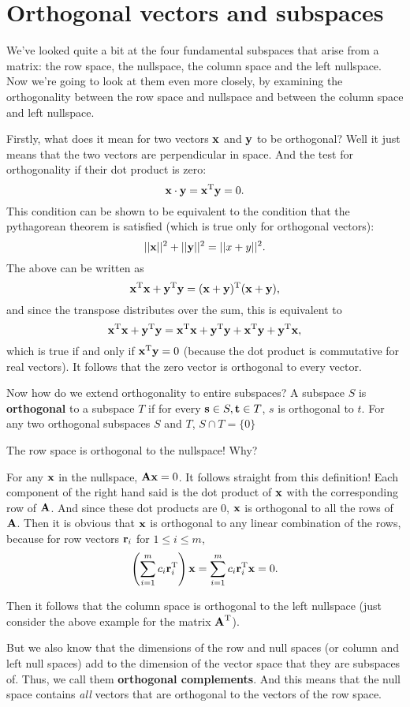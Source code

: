 \section{Orthogonal vectors and subspaces}

We've looked quite a bit at the four fundamental subspaces that arise from a matrix: the row space, the nullspace, the column space and the left nullspace. Now we're going to look at them even more closely, by examining the orthogonality between the row space and nullspace and between the column space and left nullspace.

Firstly, what does it mean for two vectors $\boldsymbol{\mathbf{x}}$ and $\boldsymbol{\mathbf{y}}$ to be orthogonal? Well it just means that the two vectors are perpendicular in space. And the test for orthogonality if their dot product is zero:
\[ \boldsymbol{\mathbf{x}} \cdot \boldsymbol{\mathbf{y}} = \boldsymbol{\mathbf{x}}^\mathrm{T} \boldsymbol{\mathbf{y}} = 0. \]
This condition can be shown to be equivalent to the condition that the pythagorean theorem is satisfied (which is true only for orthogonal vectors):
\[ ||\boldsymbol{\mathbf{x}}||^2 + ||\boldsymbol{\mathbf{y}}||^2 = ||x+y||^2. \]
The above can be written as
\[ \boldsymbol{\mathbf{x}}^\mathrm{T} \boldsymbol{\mathbf{x}} + \boldsymbol{\mathbf{y}}^\mathrm{T} \boldsymbol{\mathbf{y}} = (\boldsymbol{\mathbf{x}}+\boldsymbol{\mathbf{y}})^\mathrm{T}(\boldsymbol{\mathbf{x}} + \boldsymbol{\mathbf{y}}), \]
and since the transpose distributes over the sum, this is equivalent to
\[ \boldsymbol{\mathbf{x}}^\mathrm{T} \boldsymbol{\mathbf{x}} + \boldsymbol{\mathbf{y}}^\mathrm{T} \boldsymbol{\mathbf{y}} = \boldsymbol{\mathbf{x}}^\mathrm{T} \boldsymbol{\mathbf{x}} + \boldsymbol{\mathbf{y}}^\mathrm{T} \boldsymbol{\mathbf{y}} + \boldsymbol{\mathbf{x}}^\mathrm{T} \boldsymbol{\mathbf{y}} + \boldsymbol{\mathbf{y}}^\mathrm{T} \boldsymbol{\mathbf{x}}, \]
which is true if and only if $\boldsymbol{\mathbf{x}}^\mathrm{T} \boldsymbol{\mathbf{y}} = 0$ (because the dot product is commutative for real vectors). It follows that the zero vector is orthogonal to every vector. 

Now how do we extend orthogonality to entire subspaces?
\bdf
A subspace $S$ is \textbf{orthogonal} to a subspace $T$ if for every $\boldsymbol{\mathbf{s}} \in S, \boldsymbol{\mathbf{t}} \in T$, $s$ is orthogonal to $t$.
\edf
\brm
For any two orthogonal subspaces $S$ and $T$, $S \cap T = \{0\}$
\erm

\bex
The row space is orthogonal to the nullspace! Why?

For any $\boldsymbol{\mathbf{x}}$ in the nullspace, $\boldsymbol{\mathbf{A}}\boldsymbol{\mathbf{x}} = 0$. It follows straight from this definition! Each component of the right hand said is the dot product of $\boldsymbol{\mathbf{x}}$ with the corresponding row of $\boldsymbol{\mathbf{A}}$. And since these dot products are 0, $\boldsymbol{\mathbf{x}}$ is orthogonal to all the rows of $\boldsymbol{\mathbf{A}}$. Then it is obvious that $\boldsymbol{\mathbf{x}}$ is orthogonal to any linear combination of the rows, because for row vectors $\boldsymbol{\mathbf{r}}_i$ for $1 \le i \le m$,
\[ \left(\sum_{i=1}^m c_i \boldsymbol{\mathbf{r}}_i^\mathrm{T}\right)\boldsymbol{\mathbf{x}} = \sum_{i=1}^m c_i \boldsymbol{\mathbf{r}}_i^\mathrm{T} \boldsymbol{\mathbf{x}} = 0. \]
\eex

Then it follows that the column space is orthogonal to the left nullspace (just consider the above example for the matrix $\boldsymbol{\mathbf{A}}^\mathrm{T}$).

But we also know that the dimensions of the row and null spaces (or column and left null spaces) add to the dimension of the vector space that they are subspaces of. Thus, we call them \textbf{orthogonal complements}. And this means that the null space contains \textit{all} vectors that are orthogonal to the vectors of the row space. 

